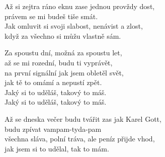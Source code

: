 
\ve{}
Až si zejtra ráno eknu zase jednou provždy dost,\\
právem se mi budeš tiše smát.\\
Jak omluvit si svoji slabost, nenávist a zlost,\\
když za všechno si můžu vlastně sám. 

\cho{}
Za spoustu dní, možná za spoustu let,\\
až se mi rozední, budu ti vyprávět,\\
na první signální jak jsem obletěl svět,\\
jak tě to omámí a nepustí zpět.\\
Jaký si to uděláš, takový to máš.\\
Jaký si to uděláš, takový to máš. 

\ve{}
Až se dneska večer budu tvářit zas jak Karel Gott,\\
budu zpívat vampam-tyda-pam\\
všechna sláva, polní tráva, ale peníz přijde vhod,\\
jak jsem si to udělal, tak to mám.

\cho{}

\esong